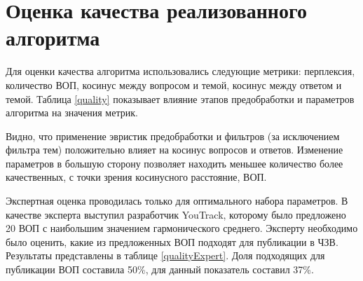 \chapter{Оценка качества реализованного алгоритма}
\label{chap:quality}

Для оценки качества алгоритма использовались следующие метрики: перплексия, количество ВОП, косинус между вопросом и темой, косинус между ответом и темой. Таблица \ref{quality} показывает влияние этапов предобработки и параметров алгоритма на значения метрик.

Видно, что применение эвристик предобработки и фильтров (за исключением фильтра тем) положительно влияет на косинус вопросов и ответов. Изменение параметров в большую сторону позволяет находить меньшее количество более качественных, с точки зрения косинусного расстояние, ВОП.

Экспертная оценка проводилась только для оптимального набора параметров. В качестве эксперта выступил разработчик YouTrack, которому было предложено 20 ВОП с наибольшим значением гармонического среднего. Эксперту необходимо было оценить, какие из предложенных ВОП подходят для публикации в ЧЗВ. Результаты представлены в таблице \ref{qualityExpert}. Доля подходящих для публикации ВОП составила 50\%, для \cite{original} данный показатель составил 37\%. 

